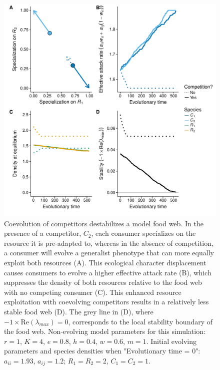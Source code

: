 \documentclass[11pt]{article}
\begin{document}
\begin{figure}[ht]
\includegraphics[scale = 0.6]{fig_theory.pdf}
\caption{Coevolution of competitors destabilizes a model food web. In the presence of a competitor, $C_2$, each consumer specializes on the resource it is pre-adapted to, whereas in the absence of competition, a consumer will evolve a generalist phenotype that can more equally exploit both resources (A). This ecological character displacement causes consumers to evolve a higher effective attack rate (B), which suppresses the density of both resources relative to the food web with no competing consumer (C). This enhanced resource exploitation with coevolving competitors results in a relatively less stable food web (D). The grey line in (D), where $-1\times \text{Re}(\lambda_{max})=0$, corresponds to the local stability boundary of the food web. Non-evolving model parameters for this simulation: $r=1$, $K=4$, $e=0.8$, $h=0.4$, $w=0.6$, $m=1$. Initial evolving parameters and species densities when "Evolutionary time = 0": $a_{ii}=1.93$, $a_{ij}=1.2$; $R_1=R_2=2$, $C_1=C_2=1$.}
\label{Fig:theory}
\end{figure}
\end{document}
